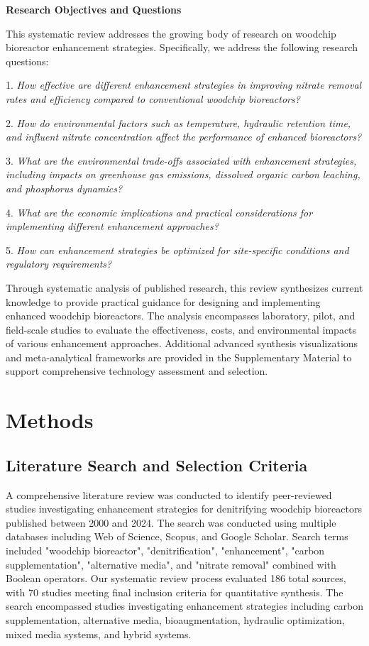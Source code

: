 \documentclass[12pt,a4paper]{article}
\begin{document}
\textbf{Research Objectives and Questions}

This systematic review addresses the growing body of research on woodchip bioreactor enhancement strategies. Specifically, we address the following research questions:

1. \textit{How effective are different enhancement strategies in improving nitrate removal rates and efficiency compared to conventional woodchip bioreactors?}

2. \textit{How do environmental factors such as temperature, hydraulic retention time, and influent nitrate concentration affect the performance of enhanced bioreactors?}

3. \textit{What are the environmental trade-offs associated with enhancement strategies, including impacts on greenhouse gas emissions, dissolved organic carbon leaching, and phosphorus dynamics?}

4. \textit{What are the economic implications and practical considerations for implementing different enhancement approaches?}

5. \textit{How can enhancement strategies be optimized for site-specific conditions and regulatory requirements?}

Through systematic analysis of published research, this review synthesizes current knowledge to provide practical guidance for designing and implementing enhanced woodchip bioreactors. The analysis encompasses laboratory, pilot, and field-scale studies to evaluate the effectiveness, costs, and environmental impacts of various enhancement approaches. Additional advanced synthesis visualizations and meta-analytical frameworks are provided in the Supplementary Material to support comprehensive technology assessment and selection.

\section{Methods}

\subsection{Literature Search and Selection Criteria}

A comprehensive literature review was conducted to identify peer-reviewed studies investigating enhancement strategies for denitrifying woodchip bioreactors published between 2000 and 2024. The search was conducted using multiple databases including Web of Science, Scopus, and Google Scholar. Search terms included "woodchip bioreactor", "denitrification", "enhancement", "carbon supplementation", "alternative media", and "nitrate removal" combined with Boolean operators. Our systematic review process evaluated 186 total sources, with 70 studies meeting final inclusion criteria for quantitative synthesis. The search encompassed studies investigating enhancement strategies including carbon supplementation, alternative media, bioaugmentation, hydraulic optimization, mixed media systems, and hybrid systems.
\end{document}
